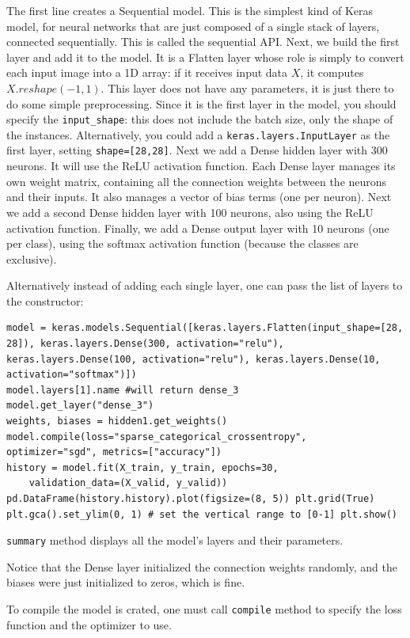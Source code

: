 The first line creates a Sequential model. This is the simplest kind of Keras model, for neural networks that are just composed of a single stack of layers, connected sequentially. This is called the sequential API. Next, we build the first layer and add it to the model. It is a Flatten layer whose role is simply to convert each input image into a 1D array: if it receives input data $X$, it computes $X.reshape(-1, 1)$. This layer does not have any parameters, it is just there to do some simple preprocessing. Since it is the first layer in the model, you should specify the \lstinline+input_shape+: this does not include the batch size, only the shape of the instances. Alternatively, you could add a \lstinline+keras.layers.InputLayer+ as the first layer, setting \lstinline+shape=[28,28]+. Next we add a Dense hidden layer with 300 neurons. It will use the ReLU activation function. Each Dense layer manages its own weight matrix, containing all the connection weights between the neurons and their inputs. It also manages a vector of bias terms (one per neuron). Next we add a second Dense hidden layer with 100 neurons, also using the ReLU activation function. Finally, we add a Dense output layer with 10 neurons (one per class), using the softmax activation function (because the classes are exclusive).

Alternatively instead of adding each single layer, one can pass the list of layers to the constructor:
\begin{lstlisting}
model = keras.models.Sequential([keras.layers.Flatten(input_shape=[28, 28]), keras.layers.Dense(300, activation="relu"), keras.layers.Dense(100, activation="relu"), keras.layers.Dense(10, activation="softmax")])
model.layers[1].name #will return dense_3
model.get_layer("dense_3")
weights, biases = hidden1.get_weights()
model.compile(loss="sparse_categorical_crossentropy",  optimizer="sgd", metrics=["accuracy"])
history = model.fit(X_train, y_train, epochs=30,
    validation_data=(X_valid, y_valid))
pd.DataFrame(history.history).plot(figsize=(8, 5)) plt.grid(True)
plt.gca().set_ylim(0, 1) # set the vertical range to [0-1] plt.show()
\end{lstlisting}

\lstinline+summary+ method displays all the model's layers and their parameters.

Notice that the Dense layer initialized the connection weights randomly, and the biases were just initialized to zeros, which is fine.

To compile the model is crated, one must call \lstinline+compile+ method to specify the loss function and the optimizer to use.

